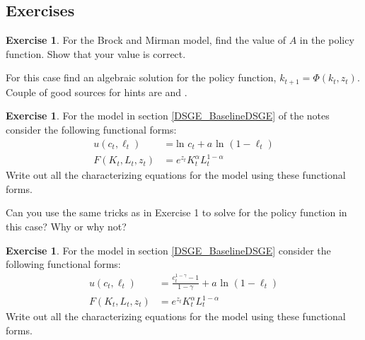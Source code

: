 \documentclass[letterpaper,12pt]{article}
\theoremstyle{definition}
\newtheorem{exercise}[theorem]{Exercise}
\begin{document}
\begin{spacing}{1.5}
\newpage
\section*{Exercises}\label{DSGE_HW}

	\begin{exercise} \label{DSGE_HW_BM_FindA}
		For the Brock and Mirman model, find the value of $A$ in the policy function.  Show that your value is correct.

		For this case find an algebraic solution for the policy function, $k_{t+1} = \Phi (k_t,z_t)$.  Couple of good sources for hints are \citet[exercise 2.2, p. 12]{StokeyLucas1989} and \citet[exercise 1.1, p. 47]{Sargent1987}.
	\end{exercise}

	\begin{exercise} \label{DSGE_HW_CharEq_Ln}
		For the model in section \ref{DSGE_BaselineDSGE} of the notes consider the following functional forms:
		\begin{equation}\label{DSGE_HW_CharEq_Ln_eq01}
		\begin{split}
		u(c_t,\ell_t) & = \text{ln }c_t + a \text{ ln }(1-\ell_t)\\
		F(K_t,L_t,z_t) & = e^{z_t}K^{\alpha}_t L^{1-\alpha}_t  \nonumber
		\end{split}
		\end{equation}
		Write out all the characterizing equations for the model using these functional forms.

		Can you use the same tricks as in Exercise 1 to solve for the policy function in this case?  Why or why not?
	\end{exercise}

	\begin{exercise} \label{DSGE_HW_CharEq_CES_Ln}
		For the model in section \ref{DSGE_BaselineDSGE} consider the following functional forms:
		\begin{equation}\label{DSGE_HW_CharEq_CES_Ln_eq01}
		\begin{split}
		u(c_t,\ell_t) & = \frac{c^{1-\gamma}_t -1}{1-\gamma}+ a \text{ ln }(1-\ell_t)\\
		F(K_t,L_t,z_t) & = e^{z_t}K^{\alpha}_t L^{1-\alpha}_t  \nonumber
		\end{split}
		\end{equation}
		Write out all the characterizing equations for the model using these functional forms.
	\end{exercise}


\end{spacing}
\end{document}

